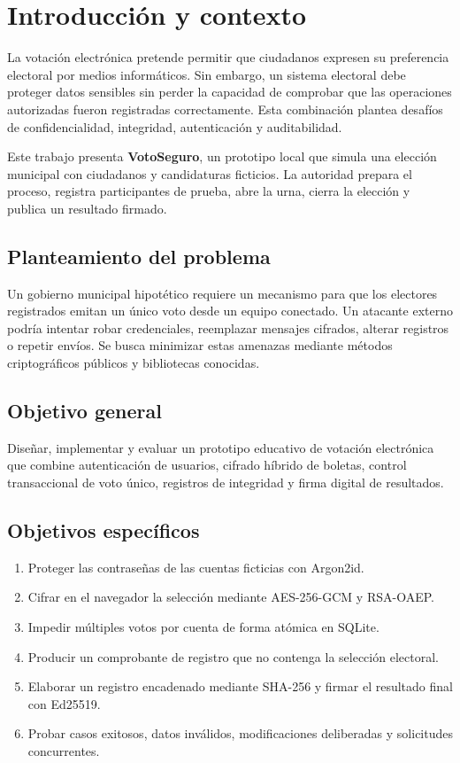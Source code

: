 \section{Introducción y contexto}
La votación electrónica pretende permitir que ciudadanos expresen su preferencia electoral por medios informáticos. Sin embargo, un sistema electoral debe proteger datos sensibles sin perder la capacidad de comprobar que las operaciones autorizadas fueron registradas correctamente. Esta combinación plantea desafíos de confidencialidad, integridad, autenticación y auditabilidad.

Este trabajo presenta \textbf{VotoSeguro}, un prototipo local que simula una elección municipal con ciudadanos y candidaturas ficticios. La autoridad prepara el proceso, registra participantes de prueba, abre la urna, cierra la elección y publica un resultado firmado.

\subsection{Planteamiento del problema}
Un gobierno municipal hipotético requiere un mecanismo para que los electores registrados emitan un único voto desde un equipo conectado. Un atacante externo podría intentar robar credenciales, reemplazar mensajes cifrados, alterar registros o repetir envíos. Se busca minimizar estas amenazas mediante métodos criptográficos públicos y bibliotecas conocidas.

\subsection{Objetivo general}
Diseñar, implementar y evaluar un prototipo educativo de votación electrónica que combine autenticación de usuarios, cifrado híbrido de boletas, control transaccional de voto único, registros de integridad y firma digital de resultados.

\subsection{Objetivos específicos}
\begin{enumerate}
\item Proteger las contraseñas de las cuentas ficticias con Argon2id.
\item Cifrar en el navegador la selección mediante AES-256-GCM y RSA-OAEP.
\item Impedir múltiples votos por cuenta de forma atómica en SQLite.
\item Producir un comprobante de registro que no contenga la selección electoral.
\item Elaborar un registro encadenado mediante SHA-256 y firmar el resultado final con Ed25519.
\item Probar casos exitosos, datos inválidos, modificaciones deliberadas y solicitudes concurrentes.
\end{enumerate}

